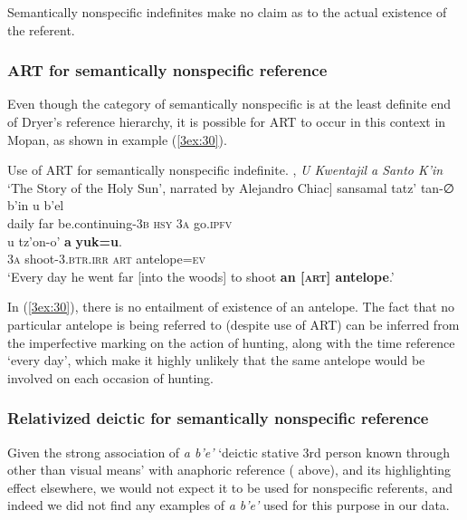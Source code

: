 \documentclass[output=paper]{langsci/langscibook}
\begin{document}
Semantically nonspecific indefinites make no claim as to the actual existence of the referent.  

\subsubsection{ART for semantically nonspecific reference}\label{3sec:351}

Even though the category of semantically nonspecific is at the least definite end of Dryer's reference hierarchy, it is possible for ART to occur in this context in Mopan, as shown in example (\ref{3ex:30}). 

\begin{exe}
\ex\label{3ex:30}
Use of ART for semantically nonspecific indefinite.  \newline
[\cite[][11]{verbeeck:99}, {\emph{U Kwentajil a Santo K'in}} `The Story of the Holy Sun', narrated by Alejandro Chiac]
\exi{}
\gll	sansamal	tatz'	tan-{∅}				b'in		u		b'el \\
	daily		far	be.continuing-{\textsc{3b}}	{\textsc{hsy}}	3{\textsc{a}}	go.{\textsc{ipfv}} \\
\glt
\exi{}
\gll	u		tz'on-o'			{\textbf{a}}	{\textbf{yuk=u}}. \\
	3{\textsc{a}}	shoot-{\textsc{3.btr.irr}}	{\textsc{art}}	antelope={\textsc{ev}} \\
\glt	`Every day he went far [into the woods] to shoot {\textbf{an [{\textsc{art}}] antelope}}.'
\end{exe}

In (\ref{3ex:30}), there is no entailment of existence of an antelope.  The fact that no particular antelope is being referred to (despite use of ART) can be inferred from the imperfective marking on the action of hunting, along with the time reference `every day', which make it highly unlikely that the same antelope would be involved on each occasion of hunting.

\subsubsection{Relativized deictic for semantically nonspecific reference}\label{3sec:352}

Given the strong association of {\emph{a b'e'}} `deictic stative 3rd person known through other than visual means' with anaphoric reference ( above), and its highlighting effect elsewhere, we would not expect it to be used for nonspecific referents, and indeed we did not find any examples of {\emph{a b'e'}} used for this purpose in our data.
\end{document}

